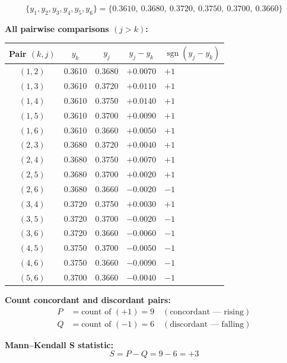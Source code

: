 \documentclass[12pt, a4paper]{article}
\begin{document}
\begin{equation}
  \{y_1, y_2, y_3, y_4, y_5, y_6\} =
  \{0.3610,\ 0.3680,\ 0.3720,\ 0.3750,\ 0.3700,\ 0.3660\}
  \label{eq:mk_series}
\end{equation}

\textbf{All pairwise comparisons $(j > k)$:}

\begin{center}
\small
\begin{tabular}{@{}ccccl@{}}
\toprule
\textbf{Pair $(k,j)$} & $y_k$ & $y_j$ &
$y_j - y_k$ & $\operatorname{sgn}(y_j - y_k)$ \\
\midrule
$(1,2)$ & 0.3610 & 0.3680 & $+0.0070$ & $+1$ \\
$(1,3)$ & 0.3610 & 0.3720 & $+0.0110$ & $+1$ \\
$(1,4)$ & 0.3610 & 0.3750 & $+0.0140$ & $+1$ \\
$(1,5)$ & 0.3610 & 0.3700 & $+0.0090$ & $+1$ \\
$(1,6)$ & 0.3610 & 0.3660 & $+0.0050$ & $+1$ \\
$(2,3)$ & 0.3680 & 0.3720 & $+0.0040$ & $+1$ \\
$(2,4)$ & 0.3680 & 0.3750 & $+0.0070$ & $+1$ \\
$(2,5)$ & 0.3680 & 0.3700 & $+0.0020$ & $+1$ \\
$(2,6)$ & 0.3680 & 0.3660 & $-0.0020$ & $-1$ \\
$(3,4)$ & 0.3720 & 0.3750 & $+0.0030$ & $+1$ \\
$(3,5)$ & 0.3720 & 0.3700 & $-0.0020$ & $-1$ \\
$(3,6)$ & 0.3720 & 0.3660 & $-0.0060$ & $-1$ \\
$(4,5)$ & 0.3750 & 0.3700 & $-0.0050$ & $-1$ \\
$(4,6)$ & 0.3750 & 0.3660 & $-0.0090$ & $-1$ \\
$(5,6)$ & 0.3700 & 0.3660 & $-0.0040$ & $-1$ \\
\bottomrule
\end{tabular}
\end{center}

\textbf{Count concordant and discordant pairs:}
\begin{align}
  P &= \text{count of } (+1) = 9 \quad (\text{concordant --- rising})
  \label{eq:P}\\
  Q &= \text{count of } (-1) = 6 \quad (\text{discordant --- falling})
  \label{eq:Q}
\end{align}

\textbf{Mann--Kendall S statistic:}
\begin{equation}
  S = P - Q = 9 - 6 = +3
  \label{eq:S_result}
\end{equation}
\end{document}
